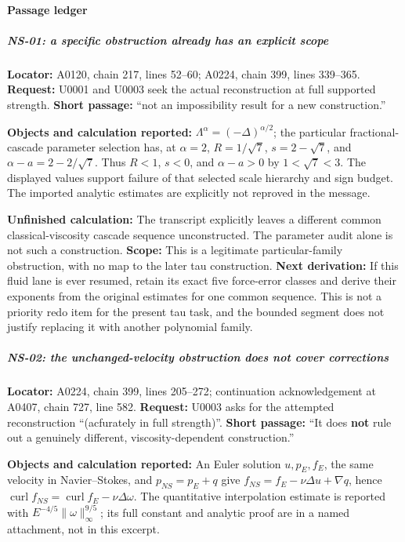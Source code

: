 \paragraph{Passage ledger}\label{passage-ledger}

\subparagraph{NS-01: a specific obstruction already has an explicit
scope}\label{ns-01-a-specific-obstruction-already-has-an-explicit-scope}

\textbf{Locator:} A0120, chain 217, lines 52--60; A0224, chain 399,
lines 339--365. \textbf{Request:} U0001 and U0003 seek the actual
reconstruction at full supported strength. \textbf{Short passage:} ``not
an impossibility result for a new construction.''

\textbf{Objects and calculation reported:}
\(\Lambda^\alpha=(-\Delta)^{\alpha/2}\); the particular
fractional-cascade parameter selection has, at \(\alpha=2\),
\(R=1/\sqrt7\), \(s=2-\sqrt7\), and \(\alpha-a=2-2/\sqrt7\). Thus
\(R<1\), \(s<0\), and \(\alpha-a>0\) by \(1<\sqrt7<3\). The displayed
values support failure of that selected scale hierarchy and sign budget.
The imported analytic estimates are explicitly not reproved in the
message.

\textbf{Unfinished calculation:} The transcript explicitly leaves a
different common classical-viscosity cascade sequence unconstructed. The
parameter audit alone is not such a construction. \textbf{Scope:} This
is a legitimate particular-family obstruction, with no map to the later
tau construction. \textbf{Next derivation:} If this fluid lane is ever
resumed, retain its exact five force-error classes and derive their
exponents from the original estimates for one common sequence. This is
not a priority redo item for the present tau task, and the bounded
segment does not justify replacing it with another polynomial family.

\subparagraph{NS-02: the unchanged-velocity obstruction does not cover
corrections}\label{ns-02-the-unchanged-velocity-obstruction-does-not-cover-corrections}

\textbf{Locator:} A0224, chain 399, lines 205--272; continuation
acknowledgement at A0407, chain 727, line 582. \textbf{Request:} U0003
asks for the attempted reconstruction ``(acfurately in full strength)''.
\textbf{Short passage:} ``It does \textbf{not} rule out a genuinely
different, viscosity-dependent construction.''

\textbf{Objects and calculation reported:} An Euler solution
\(u,p_E,f_E\), the same velocity in Navier--Stokes, and \(p_{NS}=p_E+q\)
give \(f_{NS}=f_E-\nu\Delta u+\nabla q\), hence
\(\operatorname{curl}f_{NS}=\operatorname{curl}f_E-\nu\Delta\omega\).
The quantitative interpolation estimate is reported with
\(E^{-4/5}\|\omega\|_\infty^{9/5}\); its full constant and analytic
proof are in a named attachment, not in this excerpt.

